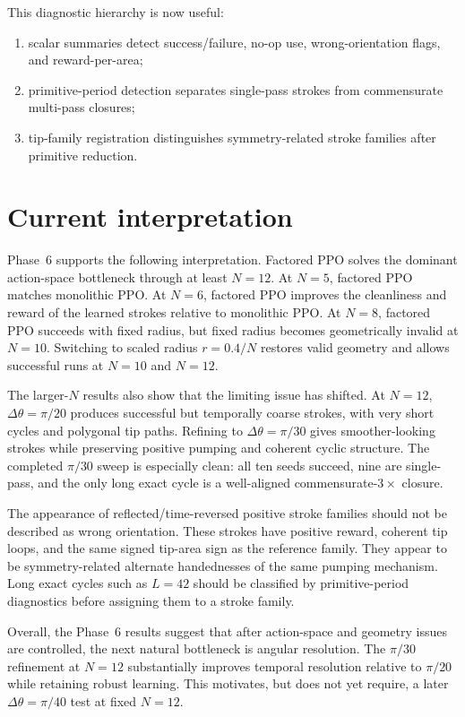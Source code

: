 \documentclass[11pt]{article}
\newcommand{\dth}{\Delta\theta}
\begin{document}
This diagnostic hierarchy is now useful:
\begin{enumerate}
\item scalar summaries detect success/failure, no-op use, wrong-orientation flags, and reward-per-area;
\item primitive-period detection separates single-pass strokes from commensurate multi-pass closures;
\item tip-family registration distinguishes symmetry-related stroke families after primitive reduction.
\end{enumerate}

\section{Current interpretation}

Phase~6 supports the following interpretation. Factored PPO solves the dominant action-space bottleneck through at least $N=12$. At $N=5$, factored PPO matches monolithic PPO. At $N=6$, factored PPO improves the cleanliness and reward of the learned strokes relative to monolithic PPO. At $N=8$, factored PPO succeeds with fixed radius, but fixed radius becomes geometrically invalid at $N=10$. Switching to scaled radius $r=0.4/N$ restores valid geometry and allows successful runs at $N=10$ and $N=12$.

The larger-$N$ results also show that the limiting issue has shifted. At $N=12$, $\dth=\pi/20$ produces successful but temporally coarse strokes, with very short cycles and polygonal tip paths. Refining to $\dth=\pi/30$ gives smoother-looking strokes while preserving positive pumping and coherent cyclic structure. The completed $\pi/30$ sweep is especially clean: all ten seeds succeed, nine are single-pass, and the only long exact cycle is a well-aligned commensurate-$3\times$ closure.

The appearance of reflected/time-reversed positive stroke families should not be described as wrong orientation. These strokes have positive reward, coherent tip loops, and the same signed tip-area sign as the reference family. They appear to be symmetry-related alternate handednesses of the same pumping mechanism. Long exact cycles such as $L=42$ should be classified by primitive-period diagnostics before assigning them to a stroke family.

Overall, the Phase~6 results suggest that after action-space and geometry issues are controlled, the next natural bottleneck is angular resolution. The $\pi/30$ refinement at $N=12$ substantially improves temporal resolution relative to $\pi/20$ while retaining robust learning. This motivates, but does not yet require, a later $\dth=\pi/40$ test at fixed $N=12$.
\end{document}

